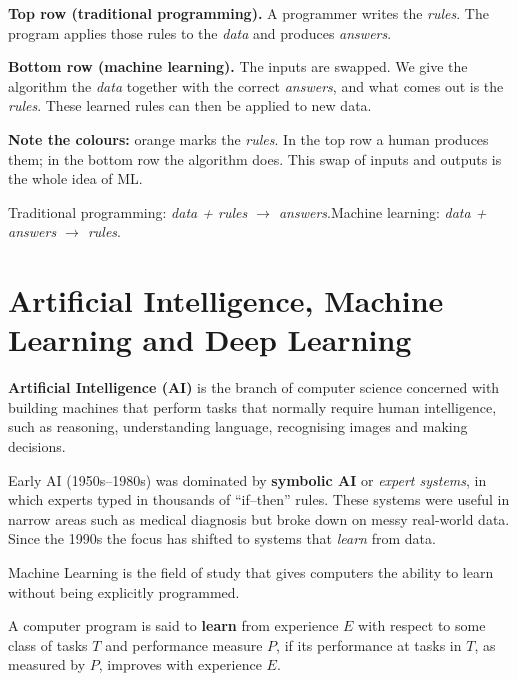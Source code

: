 \begin{explain}
\textbf{Top row (traditional programming).} A programmer writes the \emph{rules}. The program applies those rules to the \emph{data} and produces \emph{answers}.\par
\textbf{Bottom row (machine learning).} The inputs are swapped. We give the algorithm the \emph{data} together with the correct \emph{answers}, and what comes out is the \emph{rules}. These learned rules can then be applied to new data.\par
\textbf{Note the colours:} orange marks the \emph{rules}. In the top row a human produces them; in the bottom row the algorithm does. This swap of inputs and outputs is the whole idea of ML.
\end{explain}

\begin{keyidea}
Traditional programming: \emph{data + rules $\rightarrow$ answers}.\quad Machine learning: \emph{data + answers $\rightarrow$ rules}.
\end{keyidea}

\section{Artificial Intelligence, Machine Learning and Deep Learning}

\begin{definition}
\textbf{Artificial Intelligence (AI)} is the branch of computer science concerned with building machines that perform tasks that normally require human intelligence, such as reasoning, understanding language, recognising images and making decisions.
\end{definition}

Early AI (1950s--1980s) was dominated by \textbf{symbolic AI} or \emph{expert systems}, in which experts typed in thousands of ``if--then'' rules. These systems were useful in narrow areas such as medical diagnosis but broke down on messy real-world data. Since the 1990s the focus has shifted to systems that \emph{learn} from data.

\begin{definition}
Machine Learning is the field of study that gives computers the ability to learn without being explicitly programmed.
\end{definition}

\begin{definition}
A computer program is said to \textbf{learn} from experience $E$ with respect to some class of tasks $T$ and performance measure $P$, if its performance at tasks in $T$, as measured by $P$, improves with experience $E$.
\end{definition}

